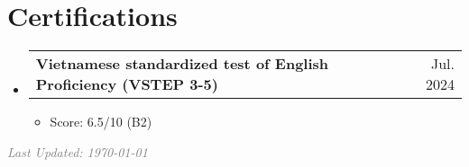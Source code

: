 \documentclass[letterpaper,11pt]{article}
\makeatletter
\newcommand{\heading}[4]{
    \normalsize
    \begin{tabular*}{0.97\textwidth}[t]{l@{\extracolsep{\fill}}r}
      \textbf{#1} & #2 \\[-2pt]
      \textit{\small#3} & \textit{\small #4}
    \end{tabular*}
    \vspace{-2pt}
}
\newcommand{\subheading}[2]{
    \normalsize
    \begin{tabular*}{0.97\textwidth}[t]{l@{\extracolsep{\fill}}r}
      \textbf{#1} & #2 \\
    \end{tabular*}
    \vspace{-2pt}
}
\makeatother
\begin{document}
\section{Certifications}
\begin{itemize}
    
    

    \item \subheading{Vietnamese standardized test of English Proficiency (VSTEP 3-5) }{Jul. 2024}
        \begin{itemize}
            \item Score: 6.5/10 (B2)
        \end{itemize}
    
    

\end{itemize}



\vfill
    \hfill\textcolor{gray}{\textit{Last Updated: \today}}
\end{document}

